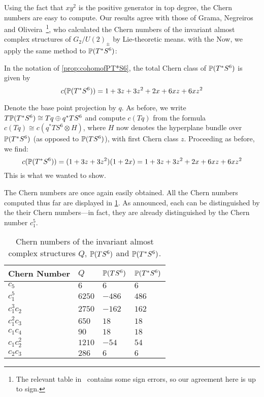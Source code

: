 Using the fact that $xy^2$ is the positive generator in top degree, the Chern numbers are easy to compute. Our results agree with those of Grama, Negreiros and Oliveira~\cite{GNO2017}\footnote{The relevant table in~\cite{GNO2017} contains some sign errors, so our agreement here is up to sign.}, who calculated the Chern numbers of the invariant almost complex structures of $G_2/U(2)_\pm$ by Lie-theoretic means. with the  Now, we apply the same method to $\P(T^*S^6)$:

\begin{prop}
	In the notation of \cref{prop:cohomofPT*S6}, the total Chern class of $\P(T^*S^6)$ is given by
	\begin{equation*}
		c(\P(T^*S^6))=1+3z+3z^2+2x+6xz+6xz^2
	\end{equation*}
\end{prop}
\begin{myproof}
	Denote the base point projection by $q$. As before, we write $T\P(T^*S^6)\cong Tq\oplus q^*TS^6$ and compute $c(Tq)$ from the formula $c(Tq)\cong c(q^*TS^6\otimes H)$, where $H$ now denotes the hyperplane bundle over $\P(T^*S^6)$ (as opposed to $\P(TS^6)$), with first Chern class $z$. Proceeding as before, we find:
	\begin{equation*}
		c(\P(T^*S^6))=(1+3z+3z^2)(1+2x)=1+3z+3z^2+2x+6xz+6xz^2
	\end{equation*}
	This is what we wanted to show.
\end{myproof}

The Chern numbers are once again easily obtained. All the Chern numbers computed thus far are displayed in \cref{tab:Qnumbers}. As announced, each can be distinguished by the their Chern numbers---in fact, they are already distinguished by the Chern number $c_1^5$.

\begin{table}[ht!]\centering
	\begin{tabular}{llll} \toprule
		Chern Number& $Q$		& $\P(TS^6)$ 	& $\P(T^*S^6)$\\ \midrule
		$c_5$ 		& $6$ 		& $6$ 			& $6$\\
		$c_1^5$ 	& $6250$	& $-486$		& $486$\\
		$c_1^3c_2$	& $2750$ 	& $-162$		& $162$\\
		$c_1^2c_3$	& $650$ 	& $18$ 			& $18$\\
		$c_1c_4$	& $90$ 		& $18$ 			& $18$\\
		$c_1c_2^2$	& $1210$ 	& $-54$ 		& $54$\\
		$c_2c_3$	& $286$ 	& $6$			& $6$\\ \bottomrule
	\end{tabular}
	\caption{Chern numbers of the invariant almost complex structures $Q$, $\P(TS^6)$ and $\P(T^*S^6)$.}\label{tab:Qnumbers}
\end{table}

